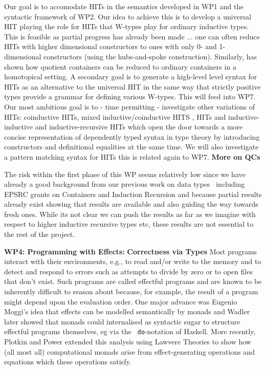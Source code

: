 \documentclass[a4paper,11pt]{article}
\begin{document}
Our goal is to accomodate HITs in the semantics developed in WP1 and
the syntactic framework of WP2. Our idea to achieve this is to develop
a universal HIT playing the role for HITs that W-types play for
ordinary inductive types. This is feasible as partial progress has
already been made ... one can often reduce HITs with higher
dimensional constructors to ones with only 0- and 1-dimensional
constructors (using the hubs-and-spoke construction). 
Similarly, \cite{gylterud:thesis,kock:groupoids} has shown how quotient 
containers can be reduced to ordinary containers in a homotopical 
setting. A secondary goal
is to generate a high-level level syntax for HITs as an alternative to
the universal HIT in the same way that strictly positive types provide
a grammar for defining various W-types. This will feed into WP7.  Our
most ambitious goal is to - time permitting - investigate other
variations of HITs: coinductive HITs, mixed inductive/coinductive HITS
\cite{txa-nisse}, HITs and inductive-inductive and inductive-recursive
HITs which open the door towards a more concise representation of
dependently typed syntax in type theory \cite{chapman2009type} by
introducing constructors and definitional equalities at the same
time. We will also investigate a pattern matching syntax for HITs this
is related again to WP7. {\bf More on QCs}


The risk within the first phase of this WP seems relatively low since we
have already a good background from our previous work on data
types~\cite{II etc} including EPSRC grants on Containers and Induction
Recursion and because partial results already exist showing that
results are available and also guiding the way towards fresh
ones. While its not clear we can push the results as far as we imagine
with respect to higher inductive recursive types etc, these results
are not essential to the rest of the project.


{\bf WP4: Programming with Effects:} {\bf Correctness via Types} Most
programs interact with their environments, e.g., to read and/or write
to the memory and to detect and respond to errors such as attempts to
divide by zero or to open files that don’t exist. Such programs are
called effectful programs and are known to be inherently difficult to
reason about because, for example, the result of a program might
depend upon the evaluation order. One major advance was Eugenio
Moggi’s idea that effects can be modelled semantically by monads and
Wadler later showed that monads could internalised as syntactic sugar
to structure effectful programs themselves, eg via the {\tt
  do}-notation of Haskell. More recently, Plotkin and Power extended
this analysis using Lawvere Theories to show how (all most all)
computational monads arise from effect-generating operations and
equations which these operations satisfy.
\end{document}
